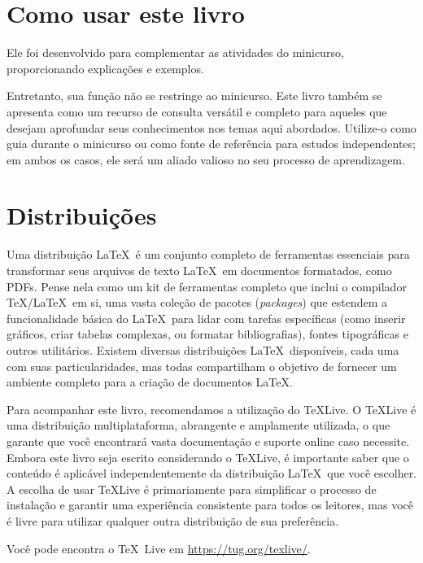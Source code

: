 \section{Como usar este livro}



Ele foi desenvolvido para complementar as atividades do minicurso, proporcionando explicações e exemplos.

Entretanto, sua função não se restringe ao minicurso.  Este livro também se apresenta como um recurso de consulta versátil e completo para aqueles que desejam aprofundar seus conhecimentos nos temas aqui abordados. Utilize-o como guia durante o minicurso ou como fonte de referência para estudos independentes; em ambos os casos, ele será um aliado valioso no seu processo de aprendizagem.

\section{Distribuições}

Uma distribuição \LaTeX\ é um conjunto completo de ferramentas essenciais para transformar seus arquivos de texto \LaTeX\ em documentos formatados, como PDFs. Pense nela como um kit de ferramentas completo que inclui o compilador \TeX/\LaTeX\ em si, uma vasta coleção de pacotes (\textit{packages}) que estendem a funcionalidade básica do \LaTeX\ para lidar com tarefas específicas (como inserir gráficos, criar tabelas complexas, ou formatar bibliografias), fontes tipográficas e outros utilitários.  Existem diversas distribuições \LaTeX\ disponíveis, cada uma com suas particularidades, mas todas compartilham o objetivo de fornecer um ambiente completo para a criação de documentos \LaTeX.

Para acompanhar este livro, recomendamos a utilização do \TeX Live. O \TeX Live é uma distribuição multiplataforma, abrangente e amplamente utilizada, o que garante que você encontrará vasta documentação e suporte online caso necessite.  Embora este livro seja escrito considerando o \TeX Live, é importante saber que o conteúdo é aplicável independentemente da distribuição \LaTeX\ que você escolher. A escolha de usar \TeX Live é primariamente para simplificar o processo de instalação e garantir uma experiência consistente para todos os leitores, mas você é livre para utilizar qualquer outra distribuição de sua preferência.

Você pode encontra o \TeX\ Live em \url{https://tug.org/texlive/}.




